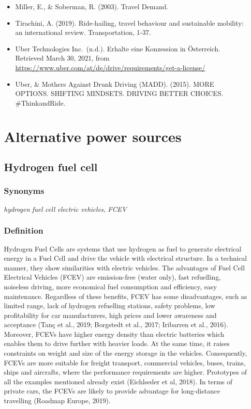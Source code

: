 \documentclass[
]{book}
\begin{document}
\begin{itemize}
\item
  Miller, E., \& Soberman, R. (2003). Travel Demand.
\item
  Tirachini, A. (2019). Ride-hailing, travel behaviour and sustainable mobility: an international review. Transportation, 1-37.
\item
  Uber Technologies Inc.~(n.d.). Erhalte eine Konzession in Österreich. Retrieved March 30, 2021, from \url{https://www.uber.com/at/de/drive/requirements/get-a-license/}
\item
  Uber, \& Mothers Against Drunk Driving (MADD). (2015). MORE OPTIONS. SHIFTING MINDSETS. DRIVING BETTER CHOICES. \#ThinkandRide.
\end{itemize}

\hypertarget{alternative}{%
\chapter{Alternative power sources}\label{alternative}}

\hypertarget{FCEV}{%
\section{Hydrogen fuel cell}\label{FCEV}}

\hypertarget{synonyms-31}{%
\subsection*{Synonyms}\label{synonyms-31}}

\emph{hydrogen fuel cell electric vehicles, FCEV}

\hypertarget{definition-35}{%
\subsection*{Definition}\label{definition-35}}

Hydrogen Fuel Cells are systems that use hydrogen as fuel to generate electrical energy in a Fuel Cell and drive the vehicle with electrical structure. In a technical manner, they show similarities with electric vehicles. The advantages of Fuel Cell Electrical Vehicles (FCEV) are emission-free (water only), fast refuelling, noiseless driving, more economical fuel consumption and efficiency, easy maintenance. Regardless of these benefits, FCEV has some disadvantages, such as limited range, lack of hydrogen refuelling stations, safety problems, low profitability for car manufacturers, high prices and lower awareness and acceptance (Tanç et al., 2019; Borgstedt et al., 2017; Iribarren et al., 2016). Moreover, FCEVs have higher energy density than electric batteries which enables them to drive further with heavier loads. At the same time, it raises constraints on weight and size of the energy storage in the vehicles. Consequently, FCEVs are more suitable for freight transport, commercial vehicles, buses, trains, ships and aircrafts, where the performance requirements are higher. Prototypes of all the examples mentioned already exist (Eichlseder et al, 2018). In terms of private cars, the FCEVs are likely to provide advantage for long-distance travelling (Roadmap Europe, 2019).
\end{document}
